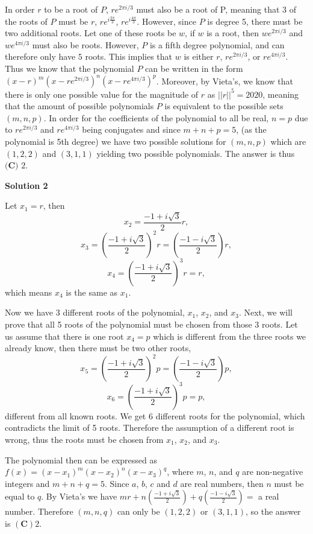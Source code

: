 \begin{enumerate}
 In order $r$ to be a root of $P$, $re^{2\pi i / 3}$ must also be a root of P, meaning that 3 of the roots of $P$ must be $r$, $re^{i\frac{2\pi}{3}}$, $re^{i\frac{4\pi}{3}}$. However, since $P$ is degree 5, there must be two additional roots. Let one of these roots be $w$, if $w$ is a root, then $we^{2\pi i / 3}$ and $we^{4\pi i / 3}$ must also be roots. However, $P$ is a fifth degree polynomial, and can therefore only have $5$ roots. This implies that $w$ is either $r$, $re^{2\pi i / 3}$, or $re^{4\pi i / 3}$. Thus we know that the polynomial $P$ can be written in the form $(x-r)^m(x-re^{2\pi i / 3})^n(x-re^{4\pi i / 3})^p$. Moreover, by Vieta's, we know that there is only one possible value for the magnitude of $r$ as $||r||^5 = 2020$, meaning that the amount of possible polynomials $P$ is equivalent to the possible sets $(m,n,p)$. In order for the coefficients of the polynomial to all be real, $n = p$ due to $re^{2\pi i / 3}$ and $re^{4 \pi i / 3}$ being conjugates and since $m+n+p = 5$, (as the polynomial is 5th degree) we have two possible solutions for $(m, n, p)$ which are $(1,2,2)$ and $(3,1,1)$ yielding two possible polynomials. The answer is thus $\boxed{\textbf{(C) } 2}$.

 



\textbf{Solution 2}

Let $x_1=r$, then 
 \[x_2=\frac{-1+i\sqrt{3}}{2} r,\] 
 \[x_3=\left( \frac{-1+i\sqrt{3}}{2} \right) ^2 r =\left( \frac{-1-i\sqrt{3}}{2} \right) r,\] 
 \[x_4=\left( \frac{-1+i\sqrt{3}}{2} \right) ^3 r=r,\] which means $x_4$ is the same as $x_1$.

 Now we have 3 different roots of the polynomial, $x_1$, $x_2$, and $x_3$. Next, we will prove that all 5 roots of the polynomial must be chosen from those 3 roots. Let us assume that there is one root $x_4=p$ which is different from the three roots we already know, then there must be two other roots, 
 \[x_5=\left( \frac{-1+i\sqrt{3}}{2} \right) ^2 p =\left( \frac{-1-i\sqrt{3}}{2} \right) p,\] 
 \[x_6=\left( \frac{-1+i\sqrt{3}}{2} \right) ^3 p=p,\] different from all known roots. We get 6 different roots for the polynomial, which contradicts the limit of 5 roots. Therefore the assumption of a different root is wrong, thus the roots must be chosen from $x_1$, $x_2$, and $x_3$.

 The polynomial then can be expressed as $f(x)=(x-x_1)^m (x-x_2)^n (x-x_3)^q$, where $m$, $n$, and $q$ are non-negative integers and $m+n+q=5$. Since $a$, $b$, $c$ and $d$ are real numbers, then $n$ must be equal to $q$. By Vieta's we have $mr + n(\frac{-1+i\sqrt{3}}{2}) + q(\frac{-1-i\sqrt{3}}{2}) =$ a real number. Therefore $(m,n,q)$ can only be $(1,2,2)$ or $(3,1,1)$, so the answer is $\boxed{\mathbf{(C)} 2}$.


\end{enumerate}
